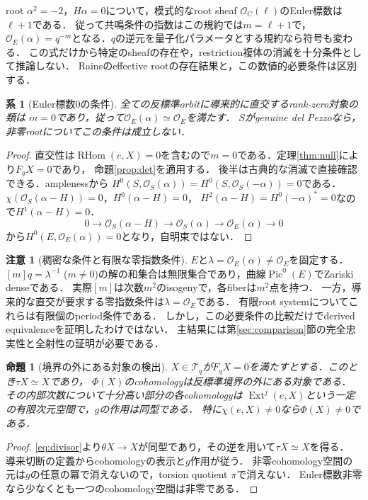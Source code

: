 \documentclass[11pt,a4paper]{ltjsarticle}
\newtheorem{proposition}[theorem]{命題}
\newtheorem{corollary}[theorem]{系}
\theoremstyle{definition}
\newtheorem{remark}[theorem]{注意}
\newcommand{\OO}{\mathcal O}
\newcommand{\TT}{\mathcal T}
\newcommand{\RHom}{\operatorname{RHom}}
\newcommand{\Ext}{\operatorname{Ext}}
\newcommand{\Pic}{\operatorname{Pic}}
\begin{document}
root $\alpha^2=-2$，$H\alpha=0$について，模式的なroot sheaf
$\OO_C(\ell)$のEuler標数は$\ell+1$である．
従って共鳴条件の指数はこの規約では$m=\ell+1$で，
$\OO_E(\alpha)=q^{-m}$となる．$q$の逆元を量子化パラメータとする規約なら符号も変わる．
この式だけから特定のsheafの存在や，restriction複体の消滅を十分条件として推論しない．
Rainsのeffective rootの存在結果と，この数値的必要条件は区別する．

\begin{corollary}[Euler標数0の条件]\label{cor:zero-index}
全ての反標準orbitに導来的に直交するrank-zero対象の類は
$m=0$であり，従って$\OO_E(\alpha)\simeq\OO_E$を満たす．
$S$がgenuine del Pezzoなら，非零rootについてこの条件は成立しない．
\end{corollary}
\begin{proof}
直交性は$\RHom(e,X)=0$を含むので$m=0$である．定理\ref{thm:null}により$F_qX=0$であり，
命題\ref{prop:det}を適用する．
後半は古典的な消滅で直接確認できる．amplenessから
$H^0(S,\OO_S(\alpha))=H^0(S,\OO_S(-\alpha))=0$である．
$\chi(\OO_S(\alpha-H))=0$，$H^0(\alpha-H)=0$，
$H^2(\alpha-H)=H^0(-\alpha)^*=0$なので$H^1(\alpha-H)=0$．
\[
 0\to\OO_S(\alpha-H)\to\OO_S(\alpha)\to\OO_E(\alpha)\to0
\]
から$H^0(E,\OO_E(\alpha))=0$となり，自明束ではない．
\end{proof}

\begin{remark}[稠密な条件と有限な零指数条件]
$E$と$\lambda=\OO_E(\alpha)\ne\OO_E$を固定する．
$[m]q=\lambda^{-1}$ ($m\ne0$)の解の和集合は無限集合であり，曲線$\Pic^0(E)$でZariski denseである．
実際$[m]$は次数$m^2$のisogenyで，各fiberは$m^2$点を持つ．
一方，導来的な直交が要求する零指数条件は$\lambda=\OO_E$である．
有限root systemについてこれらは有限個のperiod条件である．
しかし，この必要条件の比較だけでderived equivalenceを証明したわけではない．
主結果には第\ref{sec:comparison}節の完全忠実性と全射性の証明が必要である．
\end{remark}

\begin{proposition}[境界の外にある対象の検出]\label{prop:outside}
$X\in\TT_q$が$F_qX=0$を満たすとする．このとき$\tau X\simeq X$であり，
$\Phi(X)$のcohomologyは反標準境界の外にある対象である．
その内部次数について十分高い部分の各cohomologyは
$\Ext^j(e,X)$という一定の有限次元空間で，$g$の作用は同型である．
特に$\chi(e,X)\ne0$なら$\Phi(X)\ne0$である．
\end{proposition}
\begin{proof}
\eqref{eq:divisor}より$\theta X\to X$が同型であり，その逆を用いて$\tau X\simeq X$を得る．
導来切断の定義からcohomologyの表示と$g$作用が従う．
非零cohomology空間の元は$g$の任意の冪で消えないので，torsion quotient $\pi$で消えない．
Euler標数非零なら少なくとも一つのcohomology空間は非零である．
\end{proof}
\end{document}
